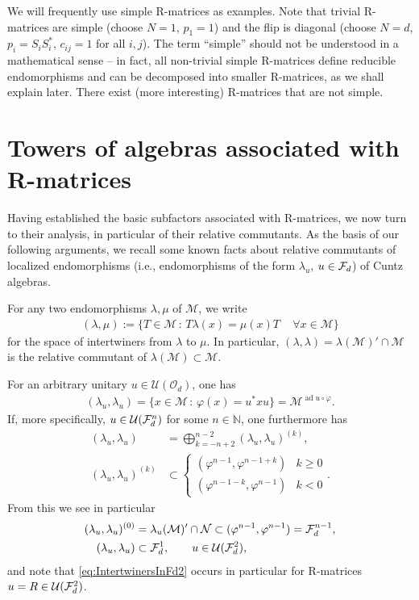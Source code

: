 \documentclass[12pt,a4paper]{amsart}
\numberwithin{equation}{section}
\theoremstyle{remark}
\DeclareMathOperator{\ad}{ad}
\newcommand{\Nl}{\mathbb{N}}
\newcommand{\la}{\lambda}
\newcommand{\CM}[0]{\mathcal{M}} \newcommand{\CN}[0]{\mathcal{N}}
\newcommand{\CO}[0]{\mathcal{O}} \newcommand{\CP}[0]{\mathcal{P}}
\newcommand{\CU}[0]{\mathcal{U}} \newcommand{\CV}[0]{\mathcal{V}}
\begin{document}
We will frequently use simple R-matrices as examples. Note that trivial R-matrices are simple (choose $N=1$, $p_1=1$) and the flip is diagonal (choose $N=d$, $p_i=S_iS_i^*$, $c_{ij}=1$ for all $i,j$). The term ``simple'' should not be understood in a mathematical sense -- in fact, all non-trivial simple R-matrices define reducible endomorphisms and can be decomposed into smaller R-matrices, as we shall explain later. There exist (more interesting) R-matrices that are not simple.



\section{Towers of algebras associated with R-matrices}\label{section:towers}

Having established the basic subfactors associated with R-matrices, we now turn to their analysis, in particular of their relative commutants. As the basis of our following arguments, we recall some known facts about relative commutants of localized endomorphisms (i.e., endomorphisms of the form $\la_u$, $u\in\mathcal{F}_d$) of Cuntz algebras. 

For any two endomorphisms $\la,\mu$ of $\CM$, we write
\begin{align*}
 (\la,\mu):=\{T\in\CM\,:\,T\la(x)=\mu(x)T\,\quad\forall x\in\CM\}
\end{align*}
for the space of intertwiners from $\la$ to $\mu$. In particular, $(\la,\la)=\la(\CM)'\cap\CM$ is the relative commutant of $\la(\CM)\subset\CM$.

For an arbitrary unitary $u\in\CU(\CO_d)$, one has \cite[Prop.~2.5]{Longo:1994_2}
\begin{align}\label{eq:SelfIntertwinersGeneral}
 (\la_u,\la_u)=\{x\in\CM\,:\,\varphi(x)=u^*xu\}
 =
 \CM^{\ad u\circ\varphi}.
\end{align}
If, more specifically, $u\in\CU(\CF_d^n)$ for some $n\in\Nl$, one furthermore has \cite[Prop.~4.2]{ContiPinzari:1996}
\begin{align}\label{eq:IntertwinersDecompositionInSpectralSubspaces}
 (\la_u,\la_u) &= 
 \bigoplus_{k=-n+2}^{n-2}(\la_u,\la_u)^{(k)},
 \\
 (\la_u,\la_u)^{(k)}
 &\subset
 \begin{cases}
  (\varphi^{n-1},\varphi^{n-1+k}) & k\geq0
  \\
  (\varphi^{n-1-k},\varphi^{n-1}) & k<0
 \end{cases}
 .
\end{align}
From this we see in particular
\begin{align}\label{eq:IntertwinersInFdn}
 (\la_u,\la_u)^{(0)}
 &=
 \la_u(\CM)'\cap\CN
 \subset(\varphi^{n-1},\varphi^{n-1})=\CF_d^{n-1},
 \\
 (\la_u,\la_u)
 &\subset
 \CF_d^1,\qquad u\in\CU(\CF_d^2),
 \label{eq:IntertwinersInFd2}
\end{align}
and note that \eqref{eq:IntertwinersInFd2} occurs in particular for R-matrices $u=R\in\CU(\CF_d^2)$.
\end{document}
